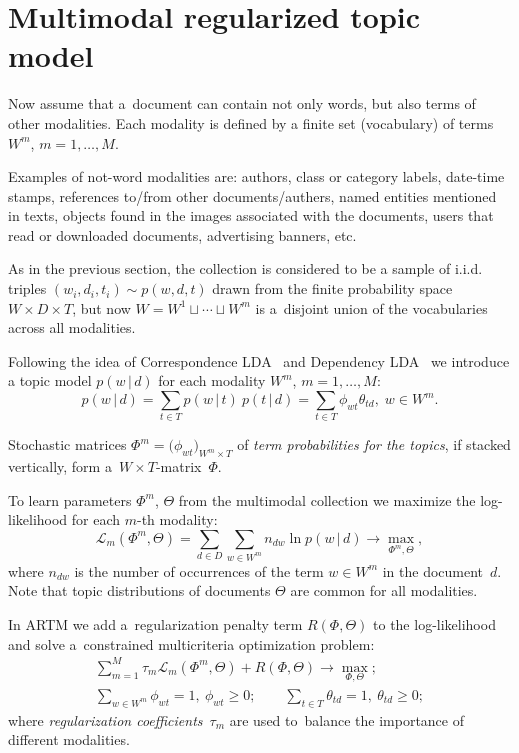 \documentclass{sig-alternate}
\newcommand{\cond}{\mspace{3mu}{|}\mspace{3mu}}
\newcommand{\cL}{\mathscr{L}}
\begin{document}
\section{Multimodal regularized topic model}
\label{sec:Multimodal}


Now assume that
a~document can contain not only words, but also terms of other modalities.
Each modality is defined by a finite set (vocabulary) of terms $W^m$, ${m=1,\dots,M}$.

Examples of not-word modalities are:
authors,
class or category labels,
date-time stamps,
references to/from other documents/authers,
named entities mentioned in texts,
objects found in the images associated with the documents,
users that read or downloaded documents,
advertising banners,
etc.

As in the previous section,
the collection is considered to be a sample of i.i.d. triples
$(w_i,d_i,t_i) \sim p(w,d,t)$
drawn from the finite probability space $W\times D \times T$,
but now ${W=W^1\sqcup\cdots\sqcup W^m}$
is a~disjoint union of the vocabularies across all modalities.

Following the idea of Correspondence LDA~\cite{blei03modeling}
and Dependency LDA~\cite{rubin12statistical}
we introduce a topic model $p(w\cond d)$
for each modality $W^m$,\; $m=1,\dots,M$:
\[
    p(w\cond d)
    = \sum_{t\in T} p(w\cond t)\: p(t\cond d)
    = \sum_{t\in T} \phi_{wt} \theta_{td},\;
    w\in W^m.
\]

Stochastic matrices ${\Phi^m = \bigl( \phi_{wt} \bigr)_{W^m\times T}}$
of \emph{term probabilities for the topics},
if stacked vertically, form a~${W\!\!\times\!T}$-matrix~$\Phi$.

To learn parameters $\Phi^m$, $\Theta$ from the multimodal collection
we maximize the log-likelihood for each $m$-th modality:
\[
    \cL_m (\Phi^m,\Theta) =
    \sum_{d\in D}\sum_{w\in W^m} n_{dw} \ln p(w\cond d)
    \to \max_{\Phi^m,\Theta},
\]
where
$n_{dw}$ is the number of occurrences of the term ${w\in W^m}$ in the document~$d$.
Note that topic distributions of documents $\Theta$ are common for all modalities.

In ARTM we add a~regularization penalty term $R(\Phi,\Theta)$ to the log-likelihood
and solve a~constrained multicriteria optimization problem:
\begin{gather}
\label{eq:multimodal}
    \sum_{m=1}^M \tau_m \cL_m (\Phi^m,\Theta)
    + R(\Phi,\Theta)
    \to \max_{\Phi,\Theta};
\\\label{eq:multimodal:norm}
    \sum_{w\in W^m}\!\!\! \phi_{wt} = 1,~
    \phi_{wt}\geq 0;
    \qquad
    \sum_{t\in T} \theta_{td} = 1,~
    \theta_{td}\geq 0;
\end{gather}
where \emph{regularization coefficients}~$\tau_m$
are used to~balance the importance of different modalities.
\end{document}

